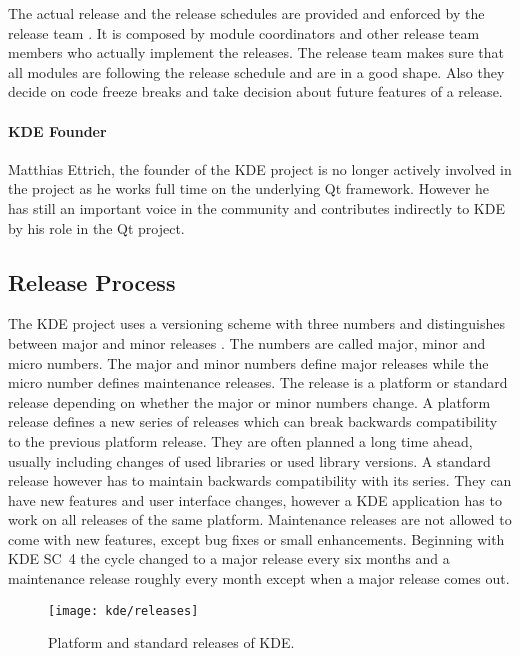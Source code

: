 The actual release and the release schedules are provided and enforced by the
release team \cite{KDEReleaseTeam}. It is composed by module coordinators and
other release team members who actually implement the releases. The release
team makes sure that all modules are following the release schedule and are in
a good shape. Also they decide on code freeze breaks and take decision about
future features of a release.

\paragraph{KDE Founder}

Matthias Ettrich, the founder of the KDE project is no longer actively involved
in the project as he works full time on the underlying Qt framework. However he
has still an important voice in the community and contributes indirectly to KDE
by his role in the Qt project.


\subsection{Release Process} %

The KDE project uses a versioning scheme with three numbers and distinguishes
between major and minor releases
\cite{KDEReleaseTeam,KDEReleaseSchedule,KDESchedule}. The numbers are called
major, minor and micro numbers. The major and minor numbers define major
releases while the micro number defines maintenance releases. The release is a
platform or standard release depending on whether the major or minor numbers
change. A platform release defines a new series of releases which can break
backwards compatibility to the previous platform release. They are often
planned a long time ahead, usually including changes of used libraries or used
library versions. A standard release however has to maintain backwards
compatibility with its series. They can have new features and user interface
changes, however a KDE application has to work on all releases of the same
platform. Maintenance releases are not allowed to come with new features,
except bug fixes or small enhancements. Beginning with \ac{KDE SC}~4 the cycle
changed to a major release every six months and a maintenance release roughly
every month except when a major release comes out.

\begin{figure}[thbp]
  \centering
  \texttt{[image: kde/releases]}
  \caption[Major Releases of KDE]{Platform and standard releases of KDE.}
\end{figure}

